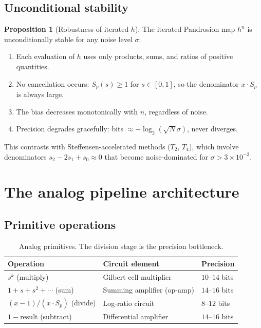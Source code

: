 \documentclass[11pt,a4paper]{article}
\theoremstyle{definition}
\newtheorem{proposition}{Proposition}[section]
\begin{document}
\subsection{Unconditional stability}

\begin{proposition}[Robustness of iterated $h$]
\label{prop:robust}
The iterated Pandrosion map $h^n$ is unconditionally stable for any noise level $\sigma$:
\begin{enumerate}
  \item Each evaluation of $h$ uses only products, sums, and ratios of positive quantities.
  \item No cancellation occurs: $S_p(s) \geq 1$ for $s \in [0,1]$, so the denominator $x \cdot S_p$ is always large.
  \item The bias decreases monotonically with $n$, regardless of noise.
  \item Precision degrades gracefully: bits $\approx -\log_2(\sqrt{N}\sigma)$, never diverges.
\end{enumerate}
This contrasts with Steffensen-accelerated methods ($T_2$, $T_4$), which involve denominators $s_2 - 2s_1 + s_0 \approx 0$ that become noise-dominated for $\sigma > 3 \times 10^{-3}$.
\end{proposition}

\section{The analog pipeline architecture}
\label{sec:pipeline}

\subsection{Primitive operations}

\begin{table}[H]
\centering
\renewcommand{\arraystretch}{1.3}
\begin{tabular}{lll}
\toprule
\textbf{Operation} & \textbf{Circuit element} & \textbf{Precision} \\
\midrule
$s^k$ (multiply) & Gilbert cell multiplier & $10$--$14$ bits \\
$1 + s + s^2 + \cdots$ (sum) & Summing amplifier (op-amp) & $14$--$16$ bits \\
$(x-1) / (x \cdot S_p)$ (divide) & Log-ratio circuit & $8$--$12$ bits \\
$1 - \text{result}$ (subtract) & Differential amplifier & $14$--$16$ bits \\
\bottomrule
\end{tabular}
\caption{Analog primitives.  The division stage is the precision bottleneck.}
\label{tab:primitives}
\end{table}
\end{document}
